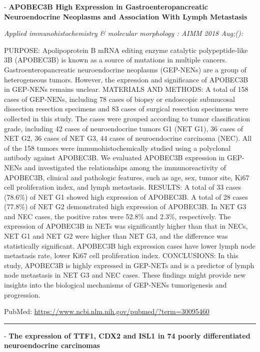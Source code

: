 \documentclass[]{article}
\begin{document}
 - \textbf{APOBEC3B High Expression in Gastroenteropancreatic
Neuroendocrine Neoplasms and Association With Lymph Metastasis}

\emph{Applied immunohistochemistry \& molecular morphology : AIMM 2018
Aug;():}

PURPOSE: Apolipoprotein B mRNA editing enzyme catalytic polypeptide-like
3B (APOBEC3B) is known as a source of mutations in multiple cancers.
Gastroenteropancreatic neuroendocrine neoplasms (GEP-NENs) are a group
of heterogeneous tumors. However, the expression and significance of
APOBEC3B in GEP-NENs remains unclear. MATERIALS AND METHODS: A total of
158 cases of GEP-NENs, including 78 cases of biopsy or endoscopic
submucosal dissection resection specimens and 83 cases of surgical
resection specimens were collected in this study. The cases were grouped
according to tumor classification grade, including 42 cases of
neuroendocrine tumors G1 (NET G1), 36 cases of NET G2, 36 cases of NET
G3, 44 cases of neuroendocrine carcinoma (NEC). All of the 158 tumors
were immunohistochemically studied using a polyclonal antibody against
APOBEC3B. We evaluated APOBEC3B expression in GEP-NENs and investigated
the relationships among the immunoreactivity of APOBEC3B, clinical and
pathologic features, such as age, sex, tumor site, Ki67 cell
proliferation index, and lymph metastasis. RESULTS: A total of 33 cases
(78.6\%) of NET G1 showed high expression of APOBEC3B. A total of 28
cases (77.8\%) of NET G2 demonstrated high expression of APOBEC3B. In
NET G3 and NEC cases, the positive rates were 52.8\% and 2.3\%,
respectively. The expression of APOBEC3B in NETs was significantly
higher than that in NECs, NET G1 and NET G2 were higher than NET G3, and
the difference was statistically significant. APOBEC3B high expression
cases have lower lymph node metastasis rate, lower Ki67 cell
proliferation index. CONCLUSIONS: In this study, APOBEC3B is highly
expressed in GEP-NETs and is a predictor of lymph node metastasis in NET
G3 and NEC cases. These findings might provide new insights into the
biological mechanisms of GEP-NENs tumorigenesis and progression.

PubMed: \url{https://www.ncbi.nlm.nih.gov/pubmed/?term=30095460}

{}

{}

\begin{center}\rule{0.5\linewidth}{\linethickness}\end{center}

 - \textbf{The expression of TTF1, CDX2 and ISL1 in 74 poorly
differentiated neuroendocrine carcinomas}
\end{document}

